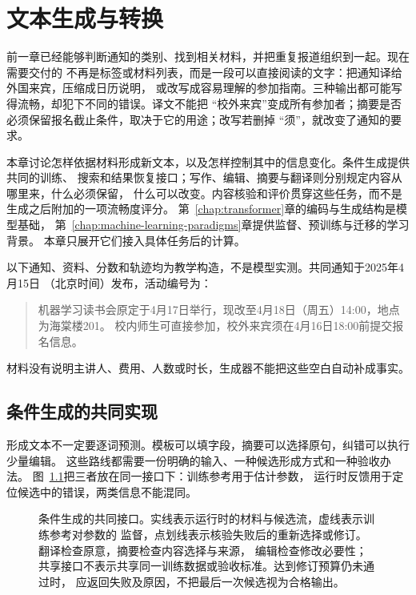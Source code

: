\chapter{文本生成与转换}
\label{chap:nlp-text-generation}

前一章已经能够判断通知的类别、找到相关材料，并把重复报道组织到一起。现在需要交付的
不再是标签或材料列表，而是一段可以直接阅读的文字：把通知译给外国来宾，压缩成日历说明，
或改写成容易理解的参加指南。三种输出都可能写得流畅，却犯下不同的错误。译文不能把
“校外来宾”变成所有参加者；摘要是否必须保留报名截止条件，取决于它的用途；改写若删掉
“须”，就改变了通知的要求。

本章讨论怎样依据材料形成新文本，以及怎样控制其中的信息变化。条件生成提供共同的训练、
搜索和结果恢复接口；写作、编辑、摘要与翻译则分别规定内容从哪里来，什么必须保留，
什么可以改变。内容核验和评价贯穿这些任务，而不是生成之后附加的一项流畅度评分。
第~\ref{chap:transformer}章的编码与生成结构是模型基础，
第~\ref{chap:machine-learning-paradigms}章提供监督、预训练与迁移的学习背景。
本章只展开它们接入具体任务后的计算。

以下通知、资料、分数和轨迹均为教学构造，不是模型实测。共同通知于2025年4月15日
（北京时间）发布，活动编号为：
\begin{quote}
机器学习读书会原定于4月17日举行，现改至4月18日（周五）14:00，地点为海棠楼201。
校内师生可直接参加，校外来宾须在4月16日18:00前提交报名信息。
\end{quote}
材料没有说明主讲人、费用、人数或时长，生成器不能把这些空白自动补成事实。

\section{条件生成的共同实现}
\label{sec:nlp-generation-interface}

形成文本不一定要逐词预测。模板可以填字段，摘要可以选择原句，纠错可以执行少量编辑。
这些路线都需要一份明确的输入、一种候选形成方式和一种验收办法。
图~\ref{fig:nlp-generation-interface}把三者放在同一接口下：训练参考用于估计参数，
运行时反馈用于定位候选中的错误，两类信息不能混同。

\begin{figure}[htbp]
  \centering
  
  \caption{条件生成的共同接口。实线表示运行时的材料与候选流，虚线表示训练参考对参数的
  监督，点划线表示核验失败后的重新选择或修订。翻译检查原意，摘要检查内容选择与来源，
  编辑检查修改必要性；共享接口不表示共享同一训练数据或验收标准。达到修订预算仍未通过时，
  应返回失败及原因，不把最后一次候选视为合格输出。}
  \label{fig:nlp-generation-interface}
\end{figure}
\FloatBarrier


